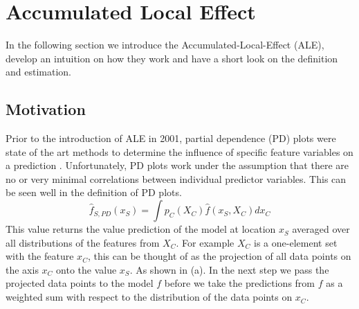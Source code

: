 \documentclass[11pt,
  a4paper,
  parskip=half, %
  BCOR=10mm, %
  english,
  ]{article}
\begin{document}
%     
%     
%     


\section{Accumulated Local Effect}
In the following section we introduce the Accumulated-Local-Effect (ALE), develop an intuition on how they work and have a short look on the definition and estimation.

\subsection{Motivation}
Prior to the introduction of ALE in 2001, partial dependence (PD) plots were state of the art methods to determine the influence of specific feature variables on a prediction \cite{friedman2001greedy}. Unfortunately, PD plots work under the assumption that there are no or very minimal correlations between individual predictor variables. 
This can be seen well in the definition of PD plots.
\begin{equation}
    \hat{f}_{S, PD}(x_S) = \int p_C(X_C) \hat{f}(x_S, X_C) d x_C
\end{equation}
This value returns the value prediction of the model at location $x_S$ averaged over all distributions of the features from $X_C$.
For example $X_C$ is a one-element set with the feature $x_C$, this can be thought of as the projection of all data points 
on the axis $x_C$ onto the value $x_S$. As shown in  (a). In the next step we pass the projected data points to the model $f$ 
before we take the predictions from $f$ as a weighted sum with respect to the distribution of the data points on $x_C$. \cite{friedman2001greedy}
\end{document}

